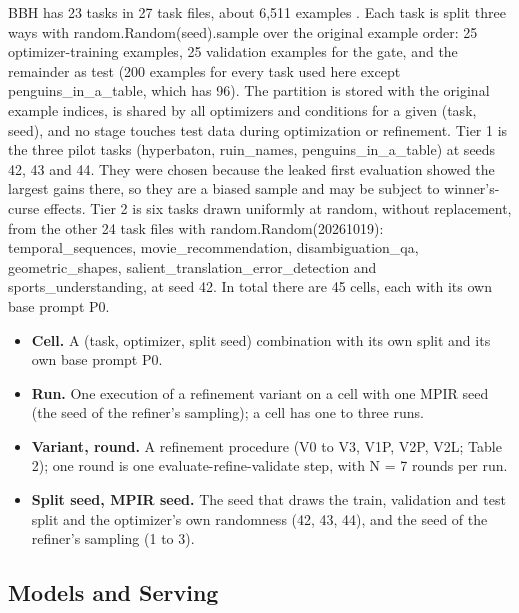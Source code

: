 \documentclass{ieeeaccess}
\begin{document}
BBH has 23 tasks in 27 task files, about 6,511 examples \cite{suzgun2023}. Each task is split three ways with random.Random(seed).sample over the original example order: 25 optimizer-training examples, 25 validation examples for the gate, and the remainder as test (200 examples for every task used here except penguins\_\allowbreak{}in\_\allowbreak{}a\_\allowbreak{}table, which has 96). The partition is stored with the original example indices, is shared by all optimizers and conditions for a given (task, seed), and no stage touches test data during optimization or refinement. Tier 1 is the three pilot tasks (hyperbaton, ruin\_\allowbreak{}names, penguins\_\allowbreak{}in\_\allowbreak{}a\_\allowbreak{}table) at seeds 42, 43 and 44. They were chosen because the leaked first evaluation showed the largest gains there, so they are a biased sample and may be subject to winner's-curse effects. Tier 2 is six tasks drawn uniformly at random, without replacement, from the other 24 task files with random.Random(20261019): temporal\_\allowbreak{}sequences, movie\_\allowbreak{}recommendation, disambiguation\_\allowbreak{}qa, geometric\_\allowbreak{}shapes, salient\_\allowbreak{}translation\_\allowbreak{}error\_\allowbreak{}detection and sports\_\allowbreak{}understanding, at seed 42. In total there are 45 cells, each with its own base prompt P0.

\begin{itemize}
\item \textbf{Cell.} A (task, optimizer, split seed) combination with its own split and its own base prompt P0.
\item \textbf{Run.} One execution of a refinement variant on a cell with one MPIR seed (the seed of the refiner's sampling); a cell has one to three runs.
\item \textbf{Variant, round.} A refinement procedure (V0 to V3, V1P, V2P, V2L; Table 2); one round is one evaluate-refine-validate step, with N = 7 rounds per run.
\item \textbf{Split seed, MPIR seed.} The seed that draws the train, validation and test split and the optimizer's own randomness (42, 43, 44), and the seed of the refiner's sampling (1 to 3).
\end{itemize}

\subsection{Models and Serving}
\end{document}

